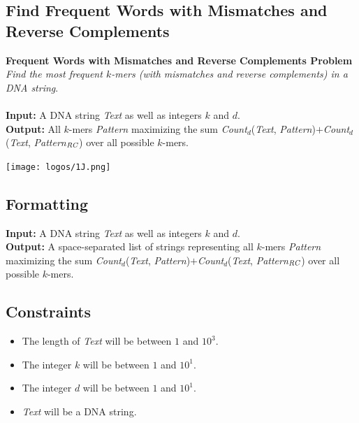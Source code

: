 \documentclass{article}
\begin{document}
\subsection{Find Frequent Words with Mismatches and Reverse Complements}
\hline\vspace{5}
\noindent \textbf{Frequent Words with Mismatches and Reverse Complements Problem}\\
\emph{Find the most frequent $k$-mers (with mismatches and reverse complements) in a DNA string}.\\ \\
\textbf{Input:} A DNA string \emph{Text} as well as integers $k$ and $d$.\\
\textbf{Output:} All $k$-mers \emph{Pattern} maximizing the sum \emph{Count}$_d$(\emph{Text}, \emph{Pattern})$+$\emph{Count}$_d$(\emph{Text}, \emph{Pattern}$_{\emph{RC}}$) over all possible $k$-mers.
\begin{center}
    \texttt{[image: logos/1J.png]} 
\end{center}
\hline\vspace{5}

\subsection*{Formatting}
\textbf{Input:} A DNA string \emph{Text} as well as integers $k$ and $d$.\\
\noindent \textbf{Output:} A space-separated list of strings representing all $k$-mers \emph{Pattern} maximizing the sum \emph{Count}$_d$(\emph{Text}, \emph{Pattern})$+$\emph{Count}$_d$(\emph{Text}, \emph{Pattern}$_{\emph{RC}}$) over all possible $k$-mers.

\subsection*{Constraints}
\begin{itemize}
    \item The length of \emph{Text} will be between $1$ and $10^3$.
    \item The integer $k$ will be between $1$ and $10^1$.
    \item The integer $d$ will be between $1$ and $10^1$.
    \item \emph{Text} will be a DNA string.
\end{itemize}
\pagebreak
\end{document}
